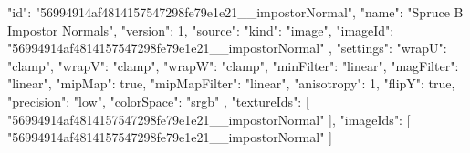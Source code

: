 {
  "id": "56994914af4814157547298fe79e1e21__impostorNormal",
  "name": "Spruce B Impostor Normals",
  "version": 1,
  "source": {
    "kind": "image",
    "imageId": "56994914af4814157547298fe79e1e21__impostorNormal"
  },
  "settings": {
    "wrapU": "clamp",
    "wrapV": "clamp",
    "wrapW": "clamp",
    "minFilter": "linear",
    "magFilter": "linear",
    "mipMap": true,
    "mipMapFilter": "linear",
    "anisotropy": 1,
    "flipY": true,
    "precision": "low",
    "colorSpace": "srgb"
  },
  "textureIds": [
    "56994914af4814157547298fe79e1e21__impostorNormal"
  ],
  "imageIds": [
    "56994914af4814157547298fe79e1e21__impostorNormal"
  ]
}
